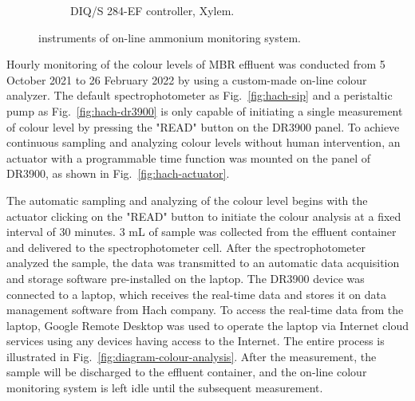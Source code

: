 \begin{figure}[h]
\begin{subfigure}{0.3\textwidth}
      \caption{DIQ/S 284-EF controller, Xylem.} \label{fig:nh3-sensor-b}
    \end{subfigure}%
  \caption{instruments of on-line ammonium monitoring system.} \label{fig:nh3-sensor}
\end{figure}

Hourly monitoring of the colour levels of MBR effluent was conducted from 5 October 2021 to 26 February 2022 by using a custom-made on-line colour analyzer. The default spectrophotometer as Fig.~\ref{fig:hach-sip} and a peristaltic pump as Fig.~\ref{fig:hach-dr3900} is only capable of initiating a single measurement of colour level by pressing the "READ" button on the DR3900 panel. To achieve continuous sampling and analyzing colour levels without human intervention, an actuator with a programmable time function was mounted on the panel of DR3900, as shown in Fig.~\ref{fig:hach-actuator}. 

The automatic sampling and analyzing of the colour level begins with the actuator clicking on the "READ" button to initiate the colour analysis at a fixed interval of 30 minutes. 3 mL of sample was collected from the effluent container and delivered to the spectrophotometer cell. After the spectrophotometer analyzed the sample, the data was transmitted to an automatic data acquisition and storage software pre-installed on the laptop. The DR3900 device was connected to a laptop, which receives the real-time data and stores it on data management software from Hach company. To access the real-time data from the laptop, Google Remote Desktop was used to operate the laptop via Internet cloud services using any devices having access to the Internet. The entire process is illustrated in Fig.~\ref{fig:diagram-colour-analysis}. After the measurement, the sample will be discharged to the effluent container, and the on-line colour monitoring system is left idle until the subsequent measurement.

